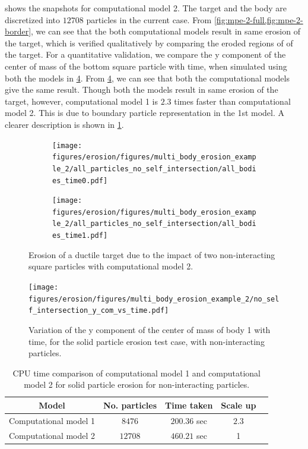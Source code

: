  shows the snapshots for computational model 2. The target
and the body are discretized into $12708$ particles in the current case. From
\cref{fig:mpe-2-full,fig:mpe-2-border}, we can see that the both computational
models result in same erosion of the target, which is verified qualitatively by
comparing the eroded regions of of the target. For a quantitative validation, we
compare the y component of the center of mass of the bottom square particle with
time, when simulated using both the models in \cref{fig:mpe-2-ycom-vs-t}. From
\cref{fig:mpe-2-ycom-vs-t}, we can see that both the computational models give
the same result. Though both the models result in same erosion of the target,
however, computational model 1 is $2.3$ times faster than computational model 2.
This is due to boundary particle representation in the 1st model. A clearer
description is shown in \cref{table:mpe-2-time-comparison}.
\begin{figure}[!htpb]
  \centering
  \begin{subfigure}{0.48\textwidth}
    \centering
    \texttt{[image: figures/erosion/figures/multi\_body\_erosion\_example\_2/all\_particles\_no\_self\_intersection/all\_bodies\_time0.pdf]}
    \subcaption{}
    \label{fig:mpe-2-full-a}
  \end{subfigure}
  \begin{subfigure}{0.48\textwidth}
    \centering
    \texttt{[image: figures/erosion/figures/multi\_body\_erosion\_example\_2/all\_particles\_no\_self\_intersection/all\_bodies\_time1.pdf]}
    \subcaption{}
    \label{fig:mpe-2-full-b}
  \end{subfigure}
  \caption{Erosion of a ductile target due to the impact of two non-interacting
    square particles with computational model 2.}
\label{fig:mpe-2-full}
\end{figure}
\begin{figure}[!htpb]
  \centering
  \texttt{[image: figures/erosion/figures/multi\_body\_erosion\_example\_2/no\_self\_intersection\_y\_com\_vs\_time.pdf]}
  \caption{Variation of the y component of the center of mass of body 1 with
    time, for the solid particle erosion test case, with non-interacting particles.}
\label{fig:mpe-2-ycom-vs-t}
\end{figure}
\begin{table}[!htpb]
\centering
\begin{tabular}{c c c c c}
  \hline
  Model & No. particles & Time taken & Scale up  \\
  \hline
  Computational model 1 & $8476$ & $200.36$ sec & $2.3$ \\
  Computational model 2 & $12708$ & $460.21$ sec & 1 \\
\end{tabular}
\caption{CPU time comparison of computational model 1 and computational model 2
  for solid particle erosion for non-interacting particles.}
\label{table:mpe-2-time-comparison}
\end{table}

